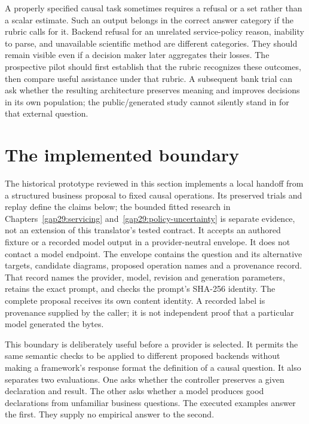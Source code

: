 A properly specified causal task sometimes requires a refusal or a set
rather than a scalar estimate. Such an output belongs in the correct
answer category if the rubric calls for it. Backend refusal for an
unrelated service-policy reason, inability to parse, and unavailable
scientific method are different categories. They should remain visible
even if a decision maker later aggregates their losses. The prospective
pilot should first establish that the rubric recognizes these outcomes,
then compare useful assistance under that rubric. A subsequent bank
trial can ask whether the resulting architecture preserves meaning and
improves decisions in its own population; the public/generated study
cannot silently stand in for that external question.
\citep{exec14_l6_adapter_exact}

\label{exec14:l6-adapter-end}


\section{The implemented boundary}

The historical prototype reviewed in this section implements a local handoff
from a structured business proposal to fixed causal operations. Its preserved
trials and replay define the claims below; the bounded fitted research in
Chapters~\ref{gap29:servicing} and~\ref{gap29:policy-uncertainty} is separate
evidence, not an extension of this translator's tested contract. It accepts an authored fixture or a recorded model
output in a provider-neutral envelope. It does not contact a model endpoint.
The envelope contains the question and its alternative targets, candidate
diagrams, proposed operation names and a provenance record. That record names
the provider, model, revision and generation parameters, retains the exact
prompt, and checks the prompt's SHA-256 identity. The complete proposal receives
its own content identity. A recorded label is provenance supplied by the caller;
it is not independent proof that a particular model generated the bytes.

This boundary is deliberately useful before a provider is selected. It permits
the same semantic checks to be applied to different proposed backends without
making a framework's response format the definition of a causal question.
It also separates two evaluations. One asks whether the controller preserves a
given declaration and result. The other asks whether a model produces good
declarations from unfamiliar business questions. The executed examples answer
the first. They supply no empirical answer to the second.

